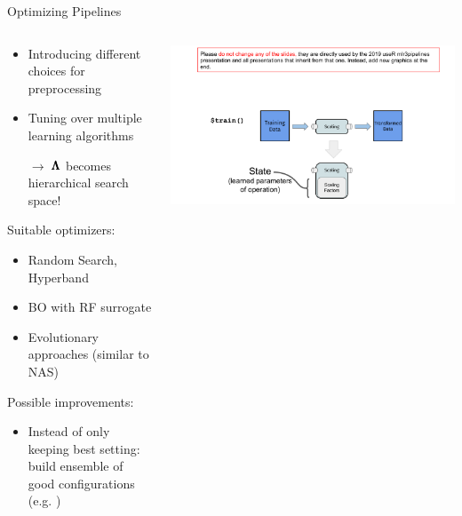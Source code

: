 \begin{frame}{Optimizing Pipelines}

  \begin{columns}
    \begin{column}{0.5\textwidth}
      \vspace*{-0.5em}
      \begin{itemize}
        \item Introducing different choices for preprocessing
        \item Tuning over multiple learning algorithms
        \item[$\rightarrow$] $\pmb{\Lambda}$ becomes hierarchical search space!
      \end{itemize}
      
      \vspace*{0.5em}

      Suitable optimizers:
      \begin{itemize}
        \item Random Search, Hyperband
        \item BO with RF surrogate
        \item Evolutionary approaches (similar to NAS)
      \end{itemize}

      Possible improvements:
      \begin{itemize}
        \item Instead of only keeping best setting: build ensemble of good configurations (e.g. )
      \end{itemize}
    \end{column}%
    \begin{column}{0.5\textwidth}
      \begin{center}
        \includegraphics[page=7, width=\textwidth, trim=160 0 30 160, clip]{images/mlr3Pipelines_graphics}
      \end{center}
    \end{column}
  \end{columns}
    
\end{frame}

